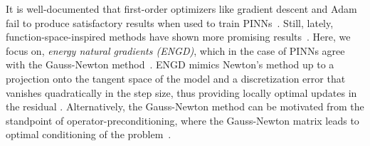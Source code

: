 It is well-documented that first-order optimizers like gradient descent and Adam fail to produce satisfactory results when used to train PINNs~\citep{cuomo2022scientific}. Still, lately, function-space-inspired methods have shown more promising results~\citep{muller2024optimization}.
Here, we focus on, \emph{energy natural gradients (ENGD)}, which in the case of PINNs agree with the Gauss-Newton method~\citep{muller2023achieving}.
ENGD mimics Newton's method up to a projection onto the tangent space of the model and a discretization error that vanishes quadratically in the step size, thus providing locally optimal updates in the residual%
. Alternatively, the Gauss-Newton method can be motivated from the standpoint of operator-preconditioning, where the Gauss-Newton matrix leads to optimal conditioning of the problem~\citep{de2023operator}.


